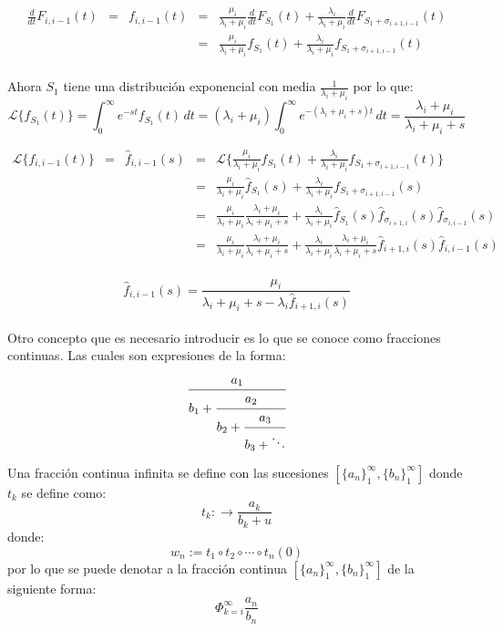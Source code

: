 \documentclass[11pt]{article}
\numberwithin{equation}{section} %
\begin{document}
\[
\begin{array}{rcrcl}
\frac{d}{dt} F_{i,i-1}(t) & = & f_{i,i-1}(t) & = & \frac{\mu_{i}}{\lambda_{i}+\mu_{i}} \frac{d}{dt} F_{S_{1}}(t) + \frac{\lambda_{i}}{\lambda_{i}+\mu_{i}} \frac{d}{dt} F_{ S_{1} + \sigma_{i+1,i-1}}(t)\\
 & & & = & \frac{\mu_{i}}{\lambda_{i}+\mu_{i}} f_{S_{1}}(t) + \frac{\lambda_{i}}{\lambda_{i}+\mu_{i}} f_{ S_{1} + \sigma_{i+1,i-1}}(t)\\
\end{array}
\]

Ahora $S_1$ tiene una distribución exponencial con media $\frac{1}{\lambda_i+\mu_i}$ por lo que:
\[
\mathcal{L}\{f_{S_1}(t)\}=\int_{0}^{\infty} e^{-st} f_{S_1}(t)\,dt=(\lambda_i+\mu_i)\int_{0}^{\infty} e^{-(\lambda_i+\mu_i+s)t}\,dt=\frac{\lambda_i+\mu_i}{\lambda_i+\mu_i+s}
\]

\[
\begin{array}{rcrcl}
\mathcal{L} \{ f_{i,i-1}(t) \} & = & \hat{f}_{i,i-1}(s) & = & \mathcal{L} \{ \frac{\mu_{i}}{\lambda_{i}+\mu_{i}} f_{S_{1}}(t) + \frac{\lambda_{i}}{\lambda_{i}+\mu_{i}} f_{ S_{1} + \sigma_{i+1,i-1}}(t) \}\\
 & & & = & \frac{\mu_{i}}{\lambda_{i}+\mu_{i}} \hat{f}_{S_{1}}(s) + \frac{\lambda_{i}}{\lambda_{i}+\mu_{i}} f_{ S_{1} + \sigma_{i+1,i-1}}(s) \\
 & & & = & \frac{\mu_{i}}{\lambda_{i}+\mu_{i}} \frac{\lambda_{i}+\mu_{i}}{\lambda_{i}+\mu_{i}+s} + \frac{\lambda_{i}}{\lambda_{i}+\mu_{i}} \hat{f}_{S_{1}}(s) \hat{f}_{\sigma_{i+1,i}}(s) \hat{f}_{\sigma_{i,i-1}}(s) \\
 & & & = & \frac{\mu_{i}}{\lambda_{i}+\mu_{i}} \frac{\lambda_{i}+\mu_{i}}{\lambda_{i}+\mu_{i}+s} + \frac{\lambda_{i}}{\lambda_{i}+\mu_{i}} \frac{\lambda_{i}+\mu_{i}}{\lambda_{i}+\mu_{i}+s} \hat{f}_{i+1,i}(s) \hat{f}_{i,i-1}(s) \\
\end{array}
\]

\begin{equation} \label{eq:distgen}
\hat{f}_{i,i-1}(s) = \frac{\mu_{i}}{\lambda_{i}+\mu_{i}+s-\lambda_{i}\hat{f}_{i+1,i}(s)}
\end{equation}\\

Otro concepto que es necesario introducir es lo que se conoce como fracciones continuas. Las cuales son expresiones de la forma:
\[
\cfrac{a_1}{b_1 + 
\cfrac{a_2}{b_2 + 
\cfrac{a_3}{b_3+ \ddots}}}
\]

Una fracción continua infinita se define con las sucesiones $\left[\{a_n\}_1^{\infty},\{b_n\}_1^{\infty}\right]$ donde $t_k$ se define como:
\[
t_k:\rightarrow \frac{a_k}{b_k+u}
\]
donde:
\[
w_n:=t_1\circ t_2 \circ \cdots \circ t_n(0)
\]
por lo que se puede denotar a la fracción continua $\left[\{a_n\}_1^{\infty},\{b_n\}_1^{\infty}\right]$ de la siguiente forma:
\[
\Phi_{k=i}^{\infty}\frac{a_n}{b_n}
\]
\end{document}
